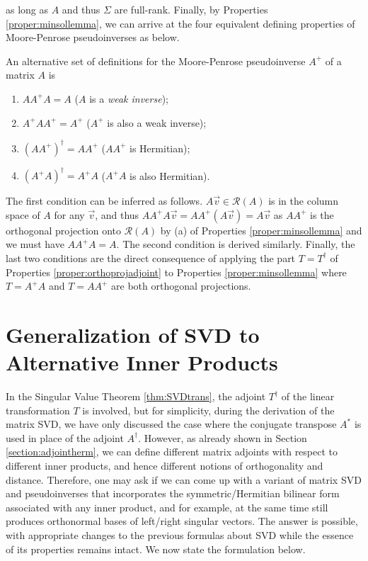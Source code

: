 as long as $A$ and thus $\Sigma$ are full-rank. Finally, by Properties \ref{proper:minsollemma}, we can arrive at the four equivalent defining properties of Moore-Penrose pseudoinverses as below.
\begin{proper}
\label{proper:pinvequiv}
An alternative set of definitions for the Moore-Penrose pseudoinverse $A^+$ of a matrix $A$ is
\begin{enumerate}
    \item $AA^+A = A$ ($A$ is a \textit{weak inverse});
    \item $A^+AA^+ = A^+$ ($A^+$ is also a weak inverse);
    \item $(AA^+)^\dag = AA^+$ ($AA^+$ is Hermitian);
    \item $(A^+A)^\dag = A^+A$ ($A^+A$ is also Hermitian).
\end{enumerate}
\end{proper}
The first condition can be inferred as follows. $A\vec{v} \in \mathcal{R}(A)$ is in the column space of $A$ for any $\vec{v}$, and thus $AA^+A\vec{v} = AA^+(A\vec{v}) = A\vec{v}$ as $AA^+$ is the orthogonal projection onto $\mathcal{R}(A)$ by (a) of Properties \ref{proper:minsollemma} and we must have $AA^+A = A$. The second condition is derived similarly. Finally, the last two conditions are the direct consequence of applying the part $T = T^\dag$ of Properties \ref{proper:orthoprojadjoint} to Properties \ref{proper:minsollemma} where $T = A^+A$ and $T= AA^+$ are both orthogonal projections.

\section{Generalization of SVD to Alternative Inner Products}

In the Singular Value Theorem \ref{thm:SVDtrans}, the adjoint $T^\dag$ of the linear transformation $T$ is involved, but for simplicity, during the derivation of the matrix SVD, we have only discussed the case where the conjugate transpose $A^*$ is used in place of the adjoint $A^\dag$. However, as already shown in Section \ref{section:adjointherm}, we can define different matrix adjoints with respect to different inner products, and hence different notions of orthogonality and distance. Therefore, one may ask if we can come up with a variant of matrix SVD and pseudoinverses that incorporates the symmetric/Hermitian bilinear form associated with any inner product, and for example, at the same time still produces orthonormal bases of left/right singular vectors. The answer is possible, with appropriate changes to the previous formulas about SVD while the essence of its properties remains intact. We now state the formulation below.

